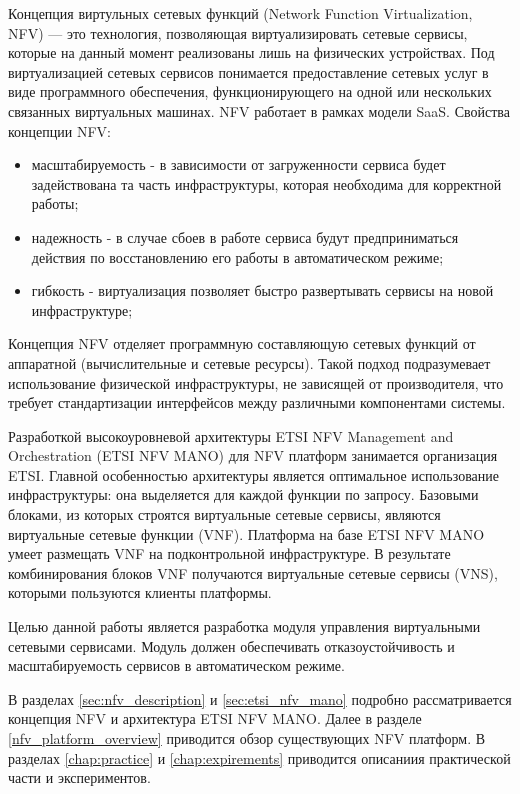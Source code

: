 \documentclass[oneside,final,14pt,a4paper]{extreport}
\begin{document}
Концепция виртульных сетевых функций (Network Function Virtualization, NFV) --- это технология, позволяющая виртуализировать сетевые сервисы, которые на данный момент реализованы лишь на физических устройствах. Под виртуализацией сетевых сервисов понимается предоставление сетевых услуг в виде программного обеспечения, функционирующего на одной или нескольких связанных виртуальных машинах. NFV работает в рамках модели SaaS. Свойства концепции NFV:
\begin{itemize}
	\item масштабируемость - в зависимости от загруженности сервиса будет задействована та часть инфраструктуры, которая необходима для корректной работы;
	\item надежность - в случае сбоев в работе сервиса будут предприниматься действия по восстановлению его работы в автоматическом режиме;
	\item гибкость - виртуализация позволяет быстро развертывать сервисы на новой инфраструктуре;
\end{itemize}

Концепция NFV отделяет программную составляющую сетевых функций от аппаратной (вычислительные и сетевые ресурсы). Такой подход подразумевает использование физической инфраструктуры, не зависящей от производителя, что требует стандартизации интерфейсов между различными компонентами системы.

Разработкой высокоуровневой архитектуры ETSI NFV Management and Orchestration (ETSI NFV MANO) для  NFV платформ занимается организация ETSI. Главной особенностью архитектуры является оптимальное использование инфраструктуры: она выделяется для каждой функции по запросу. Базовыми блоками, из которых строятся виртуальные сетевые сервисы, являются виртуальные сетевые функции (VNF). Платформа на базе ETSI NFV MANO умеет размещать VNF на подконтрольной инфраструктуре. В результате комбинирования блоков VNF получаются виртуальные сетевые сервисы (VNS), которыми пользуются клиенты платформы.

Целью данной работы является разработка модуля управления виртуальными сетевыми сервисами. Модуль должен обеспечивать отказоустойчивость и масштабируемость сервисов в автоматическом режиме.

В разделах \ref{sec:nfv_description} и \ref{sec:etsi_nfv_mano} подробно рассматривается концепция NFV и архитектура ETSI NFV MANO. Далее в разделе \ref{nfv_platform_overview} приводится обзор существующих NFV платформ. В разделах \ref{chap:practice} и \ref{chap:expirements} приводится описаниия практической части и экспериментов.
\end{document}
